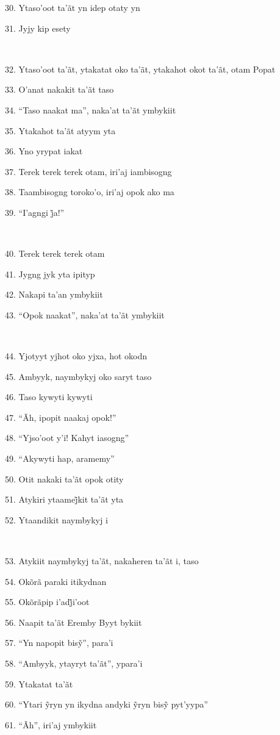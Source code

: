 30. Ytaso'oot ta'ãt yn idep otaty yn

31. Jyjy kip esety

~

32. Ytaso'oot ta'ãt, ytakatat oko ta'ãt, ytakahot okot ta'ãt, otam Popat

33. O'anat nakakit ta'ãt taso

34. ``Taso naakat ma'', naka'at ta'ãt ymbykiit

35. Ytakahot ta'ãt atyym yta

36. Yno yrypat iakat

37. Terek terek terek otam, iri'aj iambisogng

38. Taambisogng toroko'o, iri'aj opok ako ma

39. “I’agngi j̃a!”

~

40. Terek terek terek otam

41. Jygng jyk yta ipityp

42. Nakapi ta'an ymbykiit

43. ``Opok naakat'', naka'at ta'ãt ymbykiit

~

44. Yjotyyt yjhot oko yjxa, hot okodn

45. Ambyyk, naymbykyj oko saryt taso

46. Taso kywyti kywyti

47. ``Ãh, ipopit naakaj opok!''

48. ``Yjso'oot y'i! Kahyt iasogng''

49. ``Akywyti hap, aramemy''

50. Otit nakaki ta'ãt opok otity

51. Atykiri ytaamej̃kit ta’ãt yta

52. Ytaandikit naymbykyj i

~

53. Atykiit naymbykyj ta'ãt, nakaheren ta'ãt i, taso

54. Okõrã paraki itikydnan

55. Okõrãpip i’adj̃i’oot 

56. Naapit ta'ãt Eremby Byyt bykiit

57. “Yn napopit bisỹ”, para’i

58. ``Ambyyk, ytayryt ta'ãt'', ypara'i

59. Ytakatat ta'ãt

60. “Ytari ỹryn yn ikydna andyki ỹryn bisỹ pyt’yypa”

61. ``Ãh'', iri'aj ymbykiit

~

